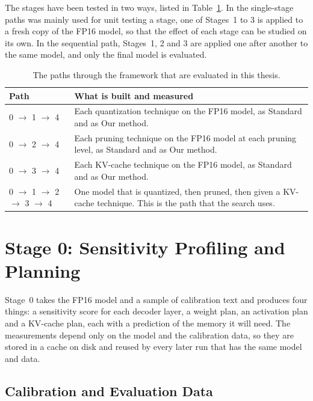 \documentclass[
11pt, %
english, %
singlespacing, %
headsepline, %
]{MastersDoctoralThesis} %
\begin{document}
The stages have been tested in two ways, listed in Table~\ref{tab:ch4-paths}. In the single-stage paths was mainly used for unit testing a stage, one of Stages~1 to 3 is applied to a fresh copy of the FP16 model, so that the effect of each stage can be studied on its own. In the sequential path, Stages~1, 2 and 3 are applied one after another to the same model, and only the final model is evaluated.

\begin{table}[htbp]
\centering
\small
\caption{The paths through the framework that are evaluated in this thesis.}
\label{tab:ch4-paths}
\renewcommand{\arraystretch}{1.2}
\begin{tabularx}{\textwidth}{lX}
\hline
\textbf{Path} & \textbf{What is built and measured} \\
\hline
0 $\rightarrow$ 1 $\rightarrow$ 4 & Each quantization technique on the FP16 model, as Standard and as Our method. \\
0 $\rightarrow$ 2 $\rightarrow$ 4 & Each pruning technique on the FP16 model at each pruning level, as Standard and as Our method. \\
0 $\rightarrow$ 3 $\rightarrow$ 4 & Each KV-cache technique on the FP16 model, as Standard and as Our method. \\
0 $\rightarrow$ 1 $\rightarrow$ 2 $\rightarrow$ 3 $\rightarrow$ 4 & One model that is quantized, then pruned, then given a KV-cache technique. This is the path that the search uses. \\
\hline
\end{tabularx}
\end{table}

\section{Stage 0: Sensitivity Profiling and Planning}
\label{sec:ch4-stage0}

Stage~0 takes the FP16 model and a sample of calibration text and produces four things: a sensitivity score for each decoder layer, a weight plan, an activation plan and a KV-cache plan, each with a prediction of the memory it will need. The measurements depend only on the model and the calibration data, so they are stored in a cache on disk and reused by every later run that has the same model and data.

\subsection{Calibration and Evaluation Data}
\label{sec:ch4-data}
\end{document}
